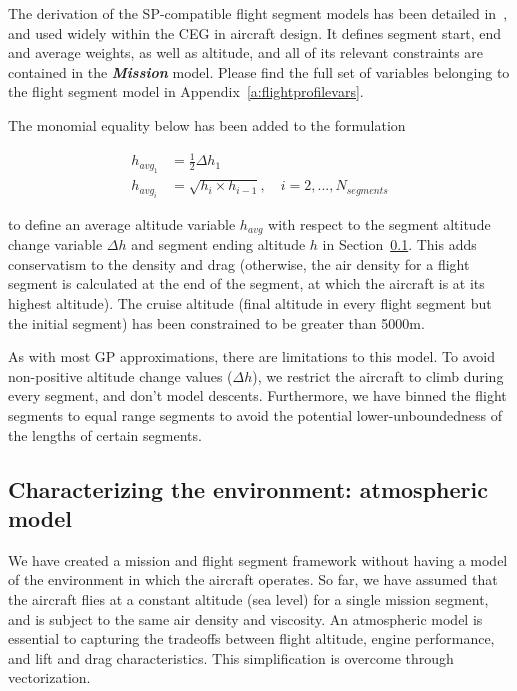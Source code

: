 The derivation of the \gls{SP}-compatible flight segment models has been detailed in~\cite{sp_ac_design},
and used widely within the \gls{CEG} in aircraft design.
It defines segment start, end and average weights,
as well as altitude, and all of its relevant constraints are contained in the \textbf{\textit{Mission}}
model. Please find the full set of variables belonging to the flight segment model in Appendix~\ref{a:flightprofilevars}.

The monomial equality below has been added to the formulation

\begin{align}
    h_{{avg}_1} &= \frac{1}{2}\Delta h_1 \\
    h_{{avg}_i} &= \sqrt{h_{i} \times h_{i-1}}, \quad i = 2,...,N_{segments}
\end{align}

to define an average altitude variable $h_{avg}$ with respect to the segment altitude change variable $\Delta h$
and segment ending altitude $h$
in Section~\ref{s:atmos}. This adds
conservatism to the density and drag (otherwise, the air density for a flight segment is calculated
at the end of the segment, at which the aircraft is at its highest altitude).
The cruise altitude (final altitude in every flight segment but the initial segment) has been constrained
to be greater than 5000m.

As with most \gls{GP} approximations, there are limitations to this model. To avoid non-positive
altitude change values ($\Delta h$), we restrict the aircraft to climb during every segment, and
don't model descents. Furthermore, we have binned the flight segments to equal range segments to
avoid the potential lower-unboundedness of the lengths of certain segments.

\subsection{Characterizing the environment: atmospheric model}
\label{s:atmos}

We have created a mission and flight segment framework without having a model
of the environment in which the aircraft operates. So far, we have assumed that
the aircraft flies at a constant altitude (sea level) for a single mission segment,
and is subject to the same air density and viscosity.
An atmospheric model is essential to capturing the tradeoffs between flight altitude, engine performance,
and lift and drag characteristics.
This simplification is overcome through vectorization.

